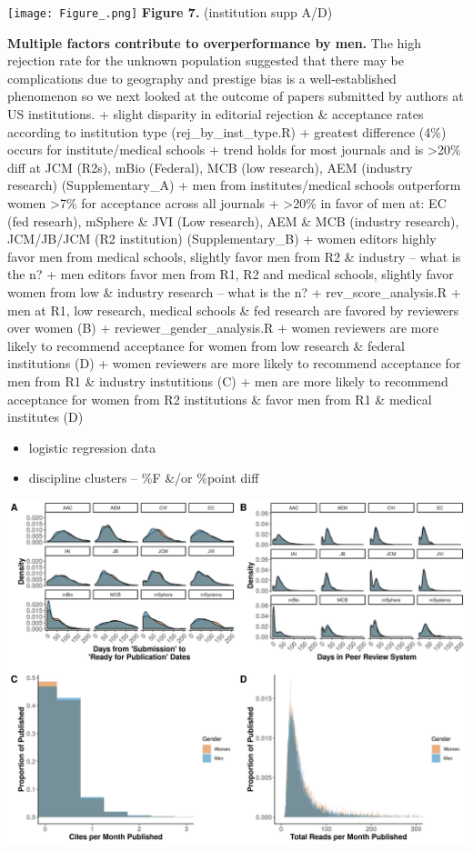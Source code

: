 \documentclass[11pt,]{article}
\providecommand{\tightlist}{%
  \setlength{\itemsep}{0pt}\setlength{\parskip}{0pt}}
\begin{document}
\texttt{[image: Figure\_.png]} \textbf{Figure 7.} (institution supp A/D)

\textbf{Multiple factors contribute to overperformance by men.} The high
rejection rate for the unknown population suggested that there may be
complications due to geography and prestige bias is a well-established
phenomenon so we next looked at the outcome of papers submitted by
authors at US institutions. + slight disparity in editorial rejection \&
acceptance rates according to institution type (rej\_by\_inst\_type.R) +
greatest difference (4\%) occurs for institute/medical schools + trend
holds for most journals and is \textgreater{}20\% diff at JCM (R2s),
mBio (Federal), MCB (low research), AEM (industry research)
(Supplementary\_A) + men from institutes/medical schools outperform
women \textgreater{}7\% for acceptance across all journals +
\textgreater{}20\% in favor of men at: EC (fed researh), mSphere \& JVI
(Low research), AEM \& MCB (industry research), JCM/JB/JCM (R2
institution) (Supplementary\_B) + women editors highly favor men from
medical schools, slightly favor men from R2 \& industry -- what is the
n? + men editors favor men from R1, R2 and medical schools, slightly
favor women from low \& industry research -- what is the n? +
rev\_score\_analysis.R + men at R1, low research, medical schools \& fed
research are favored by reviewers over women (B) +
reviewer\_gender\_analysis.R + women reviewers are more likely to
recommend acceptance for women from low research \& federal institutions
(D) + women reviewers are more likely to recommend acceptance for men
from R1 \& industry instutitions (C) + men are more likely to recommend
acceptance for women from R2 institutions \& favor men from R1 \&
medical institutes (D)

\begin{itemize}
\tightlist
\item
  logistic regression data
\item
  discipline clusters -- \%F \&/or \%point diff
\end{itemize}

\includegraphics{Figure_9.png}
\end{document}
